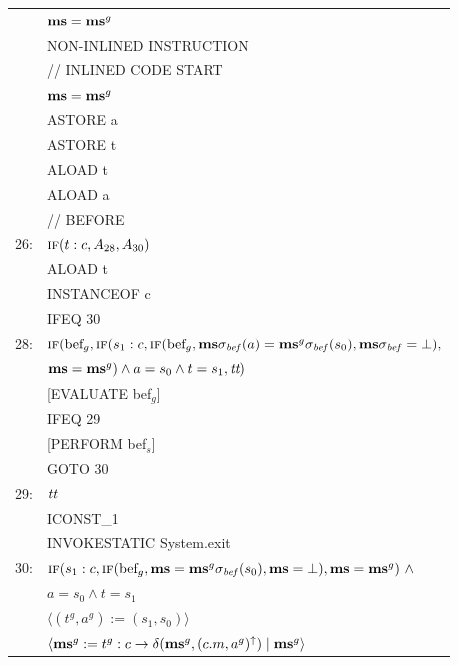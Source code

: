\documentclass[10pt,twocolumn]{article}
\newcommand{\AND}{\wedge}
\newcommand{\IF}{\mbox{\sc if}}
\newcommand{\MS}{{\bf ms}}
\newcommand{\True}{\mbox{\it tt}}
\begin{document}
\begin{figure}
{\scriptsize
\newlength{\sep}
\setlength{\sep}{0.6mm}
\ttfamily
\begin{center}
\begin{tabular}{@{}l@{~}l@{}}

        & $\MS = \MS^g$ \\
        & NON-INLINED INSTRUCTION \\[\sep]
        & // INLINED CODE START \\[\sep]
        
& $\MS = \MS^g$ \\
        & ASTORE a\\
        & ASTORE t\\
        & ALOAD t \\
        & ALOAD a \\[\sep]
        
        & // BEFORE \\[\sep]

26:     & $\IF(t:c, A_{28}, A_{30})$ \\
        & ALOAD t \\
        & INSTANCEOF c \\
        & IFEQ 30 \\[\sep]
        
28:     & $\IF(\mbox{bef}_g, \IF(s_1:c, \IF(\mbox{bef}_g, \MS\sigma_{\it bef}(a) = \MS^g\sigma_{\it bef}(s_0), \MS\sigma_{\it bef} = \bot), $\\
        & $\MS = \MS^g) \AND a = s_0 \AND t = s_1, \True) $ \\
        & [EVALUATE bef$_g$] \\
        & IFEQ 29 \\
        & [PERFORM bef$_s$] \\
        & GOTO 30 \\[\sep]
        
29:     & $\True$ \\
        & ICONST\_1 \\
        & INVOKESTATIC System.exit \\[\sep]

30:     & $\IF(s_1:c, \IF(\mbox{bef}_g, \MS = \MS^g\sigma_{\it bef}(s_0), \MS = \bot), \MS = \MS^g)\ \AND $\\
        & \hphantom{~~~~} $a = s_0 \AND t = s_1 $ \\
        & $\langle (t^g, a^g) := (s_1, s_0) \rangle$ \\
        & $\langle \MS^g := t^g : c \rightarrow \delta(\MS^g, (c.m, a^g)^\uparrow) \mid \MS^g \rangle$ \\[\sep]
        

\end{tabular}
\end{center}}
\end{figure}
\end{document}
